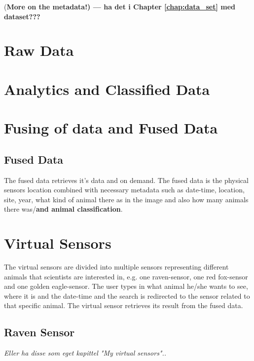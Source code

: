 \documentclass[USenglish]{uit-thesis}
\begin{document}
(\textbf{More on the metadata!) --- ha det i Chapter \ref{chap:data_set} med dataset???}


\section{Raw Data}
\section{Analytics and Classified Data}

\section{Fusing of data and Fused Data}
\subsection{Fused Data}
The fused data retrieves it's data and on demand. The fused data is the physical sensors location combined with necessary metadata such as date-time, location, site, year, what kind of animal there as in the image and also how many animals there was/\textbf{and animal classification}.



\section{Virtual Sensors}
The virtual sensors are divided into multiple sensors representing different animals that scientists are interested in, e.g. one raven-sensor, one red fox-sensor and one golden eagle-sensor.
The user types in what animal he/she wants to see, where it is and the date-time and the search is redirected to the sensor related to that specific animal. The virtual sensor retrieves its result from the fused data.

\subsection{Raven Sensor}
\textit{Eller ha disse som eget kapittel "My virtual sensors"..}
\end{document}
